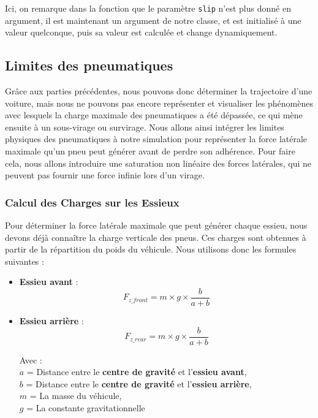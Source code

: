 Ici, on remarque dans la fonction que le paramètre \texttt{slip} n'est plus donné en argument, il est maintenant un argument de notre classe, et est initialisé à une valeur quelconque, puis sa valeur est calculée et change dynamiquement.

\subsection{Limites des pneumatiques}

Grâce aux parties précédentes, nous pouvons donc déterminer la trajectoire d'une voiture, mais nous ne pouvons pas encore représenter et visualiser les phénomènes avec lesquels la charge maximale des pneumatiques a été dépassée, ce qui mène ensuite à un sous-virage ou survirage.
Nous allons ainsi intégrer les limites physiques des pneumatiques à notre simulation pour représenter la force latérale maximale qu'un pneu peut générer avant de perdre son adhérence.
Pour faire cela, nous allons introduire une saturation non linéaire des forces latérales, qui ne peuvent pas fournir une force infinie lors d'un virage.

\subsubsection{Calcul des Charges sur les Essieux}

Pour déterminer la force latérale maximale que peut générer chaque essieu, nous devons déjà connaître la charge verticale des pneus.
Ces charges sont obtenues à partir de la répartition du poids du véhicule.
Nous utilisons donc les formules suivantes :

\begin{itemize}
\item \textbf{Essieu avant} :
$$F_{z\_front} = m \times g \times \frac{b}{a+b}$$
\item \textbf{Essieu arrière} :
$$F_{z\_rear} = m \times g \times \frac{b}{a+b}$$

Avec :\\
$a$ = Distance entre le \textbf{centre de gravité} et l'\textbf{essieu avant},\\
$b$ = Distance entre le \textbf{centre de gravité} et l'\textbf{essieu arrière},\\
$m$ = La masse du véhicule, \\
$g$ = La constante gravitationnelle \\
\end{itemize}

